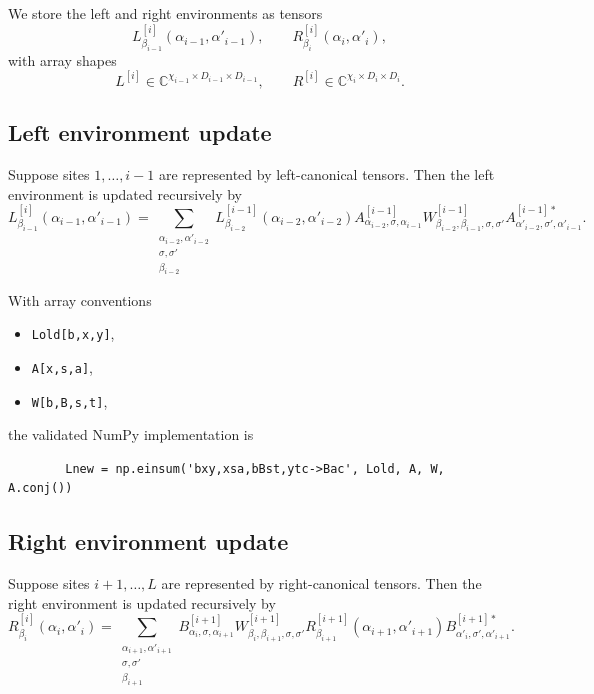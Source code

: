 \documentclass[aps,prb,onecolumn,nofootinbib]{revtex4-2}
\begin{document}
	We store the left and right environments as tensors
	\[
	L^{[i]}_{\beta_{i-1}}(\alpha_{i-1},\alpha'_{i-1}),
	\qquad
	R^{[i]}_{\beta_i}(\alpha_i,\alpha'_i),
	\]
	with array shapes
	\[
	L^{[i]} \in \mathbb{C}^{\chi_{i-1}\times D_{i-1}\times D_{i-1}},
	\qquad
	R^{[i]} \in \mathbb{C}^{\chi_i\times D_i\times D_i}.
	\]
	
	\subsection{Left environment update}
	
	Suppose sites $1,\dots,i-1$ are represented by left-canonical tensors. Then the
	left environment is updated recursively by
	\begin{equation}
		L^{[i]}_{\beta_{i-1}}(\alpha_{i-1},\alpha'_{i-1})
		=
		\sum_{\substack{
				\alpha_{i-2},\alpha'_{i-2}\\
				\sigma,\sigma'\\
				\beta_{i-2}
		}}
		L^{[i-1]}_{\beta_{i-2}}(\alpha_{i-2},\alpha'_{i-2})
		A^{[i-1]}_{\alpha_{i-2},\sigma,\alpha_{i-1}}
		W^{[i-1]}_{\beta_{i-2},\beta_{i-1},\sigma,\sigma'}
		A^{[i-1]*}_{\alpha'_{i-2},\sigma',\alpha'_{i-1}}.
		\label{eq:left-env-consistent-rewritten}
	\end{equation}
	
	With array conventions
	\begin{itemize}
		\item \texttt{Lold[b,x,y]},
		\item \texttt{A[x,s,a]},
		\item \texttt{W[b,B,s,t]},
	\end{itemize}
	the validated NumPy implementation is
	\begin{verbatim}
		Lnew = np.einsum('bxy,xsa,bBst,ytc->Bac', Lold, A, W, A.conj())
	\end{verbatim}
	
	\subsection{Right environment update}
	
	Suppose sites $i+1,\dots,L$ are represented by right-canonical tensors. Then the
	right environment is updated recursively by
	\begin{equation}
		R^{[i]}_{\beta_i}(\alpha_i,\alpha'_i)
		=
		\sum_{\substack{
				\alpha_{i+1},\alpha'_{i+1}\\
				\sigma,\sigma'\\
				\beta_{i+1}
		}}
		B^{[i+1]}_{\alpha_i,\sigma,\alpha_{i+1}}
		W^{[i+1]}_{\beta_i,\beta_{i+1},\sigma,\sigma'}
		R^{[i+1]}_{\beta_{i+1}}(\alpha_{i+1},\alpha'_{i+1})
		B^{[i+1]*}_{\alpha'_i,\sigma',\alpha'_{i+1}}.
		\label{eq:right-env-consistent-rewritten}
	\end{equation}
	
\end{document}
